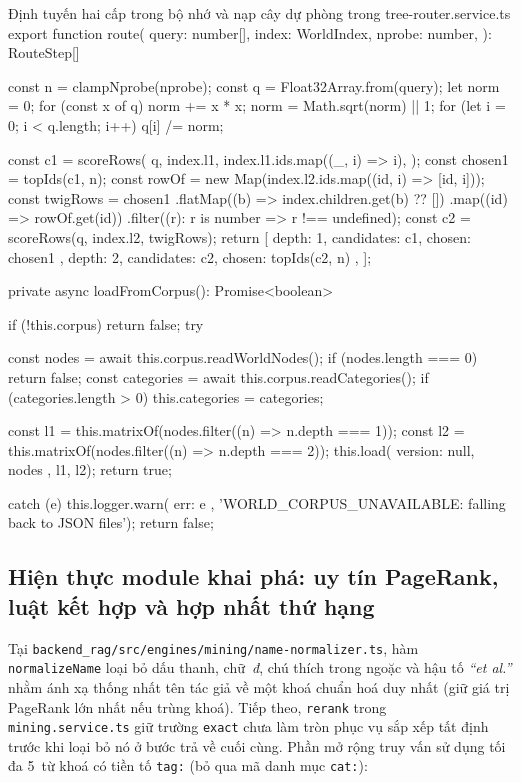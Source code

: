 \begin{tsbox}{Định tuyến hai cấp trong bộ nhớ và nạp cây dự phòng trong tree-router.service.ts}
export function route(
  query: number[],
  index: WorldIndex,
  nprobe: number,
): RouteStep[] {
  const n = clampNprobe(nprobe);
  const q = Float32Array.from(query);
  let norm = 0;
  for (const x of q) norm += x * x;
  norm = Math.sqrt(norm) || 1;
  for (let i = 0; i < q.length; i++) q[i] /= norm;

  const c1 = scoreRows(
    q,
    index.l1,
    index.l1.ids.map((_, i) => i),
  );
  const chosen1 = topIds(c1, n);
  const rowOf = new Map(index.l2.ids.map((id, i) => [id, i]));
  const twigRows = chosen1
    .flatMap((b) => index.children.get(b) ?? [])
    .map((id) => rowOf.get(id))
    .filter((r): r is number => r !== undefined);
  const c2 = scoreRows(q, index.l2, twigRows);
  return [
    { depth: 1, candidates: c1, chosen: chosen1 },
    { depth: 2, candidates: c2, chosen: topIds(c2, n) },
  ];
}

private async loadFromCorpus(): Promise<boolean> {
  if (!this.corpus) return false;
  try {
    const { nodes } = await this.corpus.readWorldNodes();
    if (nodes.length === 0) return false;
    const categories = await this.corpus.readCategories();
    if (categories.length > 0) this.categories = categories;

    const l1 = this.matrixOf(nodes.filter((n) => n.depth === 1));
    const l2 = this.matrixOf(nodes.filter((n) => n.depth === 2));
    this.load({ version: null, nodes }, l1, l2);
    return true;
  } catch (e) {
    this.logger.warn({ err: e }, 'WORLD_CORPUS_UNAVAILABLE: falling back to JSON files');
    return false;
  }
}
\end{tsbox}

\subsection{Hiện thực module khai phá: uy tín PageRank, luật kết hợp và hợp nhất thứ hạng}
\label{subsec:khai-pha-xep-hang}

Tại \texttt{backend\_\allowbreak{}rag/\allowbreak{}src/\allowbreak{}engines/\allowbreak{}mining/\allowbreak{}name-\allowbreak{}normalizer.\allowbreak{}ts}, hàm \texttt{normalizeName} loại bỏ dấu thanh, chữ~\textit{đ}, chú thích trong ngoặc và hậu tố \textit{``et al.''} nhằm ánh xạ thống nhất tên tác giả về một khoá chuẩn hoá duy nhất (giữ giá trị PageRank lớn nhất nếu trùng khoá). Tiếp theo, \texttt{rerank} trong \texttt{mining.\allowbreak{}service.\allowbreak{}ts} giữ trường \texttt{exact} chưa làm tròn phục vụ sắp xếp tất định trước khi loại bỏ nó ở bước trả về cuối cùng. Phần mở rộng truy vấn sử dụng tối đa 5~từ khoá có tiền tố \texttt{tag:} (bỏ qua mã danh mục \texttt{cat:}):

